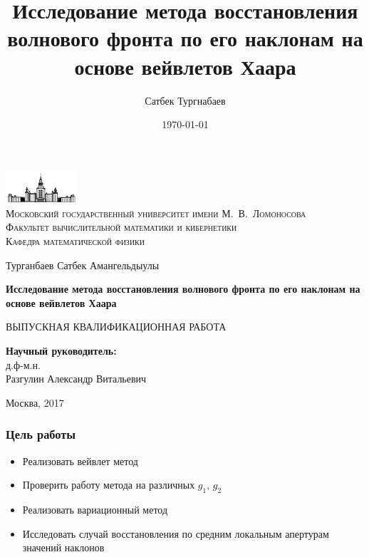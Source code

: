 \documentclass{beamer}
\title{\textbf{Исследование метода восстановления волнового фронта по его наклонам на основе вейвлетов Хаара}}  %
\author{Сатбек Тургнабаев}
\date{\today}
\begin{document}
\begin{frame}
	\thispagestyle{empty}
	\begin{rm}
	\begin{center}
		
		\includegraphics[width=0.2\textwidth]{msu_logo_small.png}\\
		\scriptsize \textsc { Московский государственный университет имени М.~В.~Ломоносова\\
		Факультет вычислительной математики и кибернетики\\
		Кафедра математической физики}
		
		\vspace{0.6 cm}
		
		\small{ Турганбаев Сатбек Амангельдыулы}
		
		\vspace{0.6 cm}
		
	        \large \textbf { Исследование метода восстановления волнового фронта по его наклонам на основе вейвлетов Хаара }

		\vspace{0.6 cm}
		
		\scriptsize  {ВЫПУСКНАЯ КВАЛИФИКАЦИОННАЯ РАБОТА }
	\end{center}
	
		\vfill
	
	\begin{flushright}
		\scriptsize{
		\textbf{Научный руководитель:}\\
		д.ф-м.н.\\
                Разгулин Александр Витальевич
               }
	\end{flushright}
	
	\vfill
	
	\begin{center}
		\small{Москва, 2017}
	\end{center}

	\end{rm}
\end{frame}
\begin{frame}
\frametitle{Цель работы}
\begin{itemize}

\item Реализовать вейвлет метод
\item Проверить работу метода на различных $g_1,\,g_2$
\item Реализовать вариационный метод
\item Исследовать случай восстановления по средним локальным апертурам значений наклонов

\end{itemize}

\end{frame}
\end{document}
